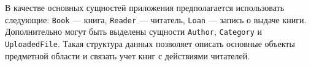 В качестве основных сущностей приложения предполагается использовать следующие:
\texttt{Book} --- книга, \texttt{Reader} --- читатель, \texttt{Loan} --- запись
о выдаче книги. Дополнительно могут быть выделены сущности \texttt{Author},
\texttt{Category} и \texttt{UploadedFile}. Такая структура данных позволяет
описать основные объекты предметной области и связать учет книг с действиями
читателей.